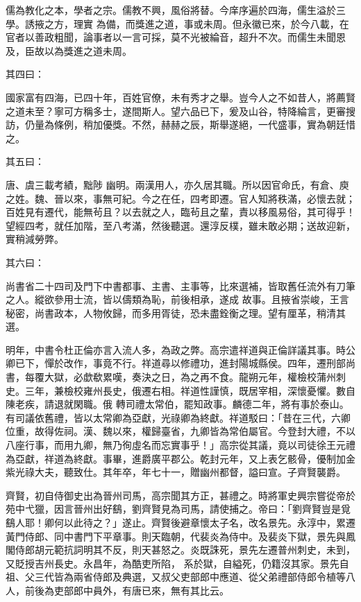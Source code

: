 \begin{pinyinscope}
 儒為教化之本，學者之宗。儒教不興，風俗將替。今庠序遍於四海，儒生溢於三學。誘掖之方，理實
 為備，而獎進之道，事或未周。但永徽已來，於今八載，在官者以善政粗聞，論事者以一言可採，莫不光被綸音，超升不次。而儒生未聞恩及，臣故以為獎進之道未周。



 其四曰：



 國家富有四海，已四十年，百姓官僚，未有秀才之舉。豈今人之不如昔人，將薦賢之道未至？寧可方稱多士，遂間斯人。望六品已下，爰及山谷，特降綸言，更審搜訪，仍量為條例，稍加優獎。不然，赫赫之辰，斯舉遂絕，一代盛事，實為朝廷惜之。



 其五曰：



 唐、虞三載考績，黜陟
 幽明。兩漢用人，亦久居其職。所以因官命氏，有倉、庾之姓。魏、晉以來，事無可紀。今之在任，四考即遷。官人知將秩滿，必懷去就；百姓見有遷代，能無茍且？以去就之人，臨茍且之輩，責以移風易俗，其可得乎！望經四考，就任加階，至八考滿，然後聽選。還淳反樸，雖未敢必期；送故迎新，實稍減勞弊。



 其六曰：



 尚書省二十四司及門下中書都事、主書、主事等，比來選補，皆取舊任流外有刀筆之人。縱欲參用士流，皆以儔類為恥，前後相承，遂成
 故事。且掖省崇峻，王言秘密，尚書政本，人物攸歸，而多用胥徒，恐未盡銓衡之理。望有厘革，稍清其選。



 明年，中書令杜正倫亦言入流人多，為政之弊。高宗遣祥道與正倫詳議其事。時公卿已下，憚於改作，事竟不行。祥道尋以修禮功，進封陽城縣侯。四年，遷刑部尚書，每覆大獄，必歔欷累嘆，奏決之日，為之再不食。龍朔元年，權檢校蒲州刺史。三年，兼檢校雍州長史，俄遷右相。祥道性謹慎，既居宰相，深懷憂懼。數自陳老疾，請退就閑職。俄
 轉司禮太常伯，罷知政事。麟德二年，將有事於泰山。有司議依舊禮，皆以太常卿為亞獻，光祿卿為終獻。祥道駁曰：「昔在三代，六卿位重，故得佐祠。漢、魏以來，權歸臺省，九卿皆為常伯屬官。今登封大禮，不以八座行事，而用九卿，無乃徇虛名而忘實事乎！」高宗從其議，竟以司徒徐王元禮為亞獻，祥道為終獻。事畢，進爵廣平郡公。乾封元年，又上表乞骸骨，優制加金紫光祿大夫，聽致仕。其年卒，年七十一，贈幽州都督，謚曰宣。子齊賢襲爵。



 齊賢，初自侍御史出為晉州司馬，高宗聞其方正，甚禮之。時將軍史興宗嘗從帝於苑中弋獵，因言晉州出好鷂，劉齊賢見為司馬，請使捕之。帝曰：「劉齊賢豈是覓鷂人耶！卿何以此待之？」遂止。齊賢後避章懷太子名，改名景先。永淳中，累遷黃門侍郎、同中書門下平章事。則天臨朝，代裴炎為侍中。及裴炎下獄，景先與鳳閣侍郎胡元範抗詞明其不反，則天甚怒之。炎既誅死，景先左遷普州刺史，未到，又貶授吉州長史。永昌年，為酷吏所陷，
 系於獄，自縊死，仍籍沒其家。景先自祖、父三代皆為兩省侍郎及典選，又叔父吏部郎中應道、從父弟禮部侍郎令植等八人，前後為吏部郎中員外，有唐已來，無有其比云。




\end{pinyinscope}
